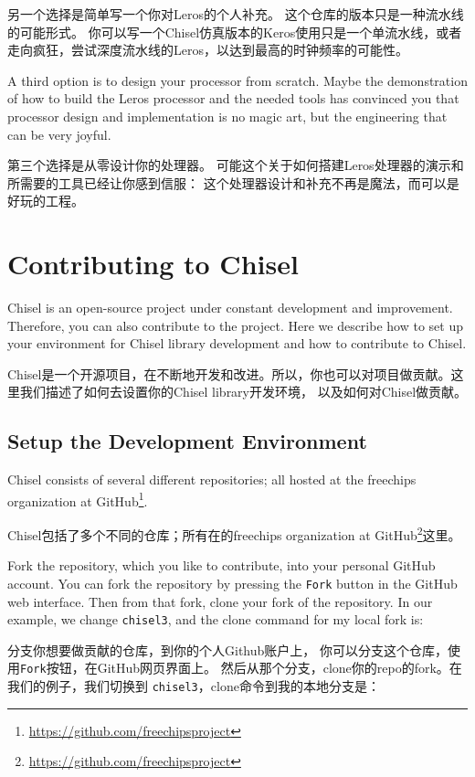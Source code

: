 \documentclass[%
    10pt,
    headinclude, footexclude,
    openright, %
    notitlepage,
    cleardoubleempty,
    headsepline,
    pointlessnumbers,
    bibtotoc, idxtotoc,
    ]{scrbook}
\newcommand{\code}[1]{{\small{\texttt{#1}}}}
\newcommand{\myref}[2]{\href{#1}{#2}}
\renewcommand{\myref}[2]{{#2}{\footnote{\url{#1}}}}
\begin{document}
{另一个选择是简单写一个你对Leros的个人补充。
这个仓库的版本只是一种流水线的可能形式。
你可以写一个Chisel仿真版本的Keros使用只是一个单流水线，或者走向疯狂，尝试深度流水线的Leros，以达到最高的时钟频率的可能性。


A third option is to design your processor from scratch. Maybe the demonstration of
how to build the Leros processor and the needed tools has convinced you that processor
design and implementation is no magic art, but the engineering that can be very joyful.

第三个选择是从零设计你的处理器。
可能这个关于如何搭建Leros处理器的演示和所需要的工具已经让你感到信服：
这个处理器设计和补充不再是魔法，而可以是好玩的工程。

\chapter{Contributing to Chisel}

Chisel is an open-source project under constant development and improvement.
Therefore, you can also contribute to the project. Here we describe how to
set up your environment for Chisel library development and how to contribute
to Chisel.

Chisel是一个开源项目，在不断地开发和改进。所以，你也可以对项目做贡献。这里我们描述了如何去设置你的Chisel library开发环境，
以及如何对Chisel做贡献。

\section{Setup the Development Environment}

Chisel consists of several different repositories; all hosted at
the \myref{https://github.com/freechipsproject}{freechips organization at GitHub}.

Chisel包括了多个不同的仓库；所有在的\myref{https://github.com/freechipsproject}{freechips organization at GitHub}这里。

Fork the repository, which you like to contribute, into your personal GitHub account.
You can fork the repository by pressing the \code{Fork} button in the GitHub web interface.
Then from that fork, clone your fork of the repository. In our example, we change
\code{chisel3}, and the clone command for my local fork is:

分支你想要做贡献的仓库，到你的个人Github账户上，
你可以分支这个仓库，使用\code{Fork}按钮，在GitHub网页界面上。
然后从那个分支，clone你的repo的fork。在我们的例子，我们切换到
\code{chisel3}，clone命令到我的本地分支是：

}
\end{document}
